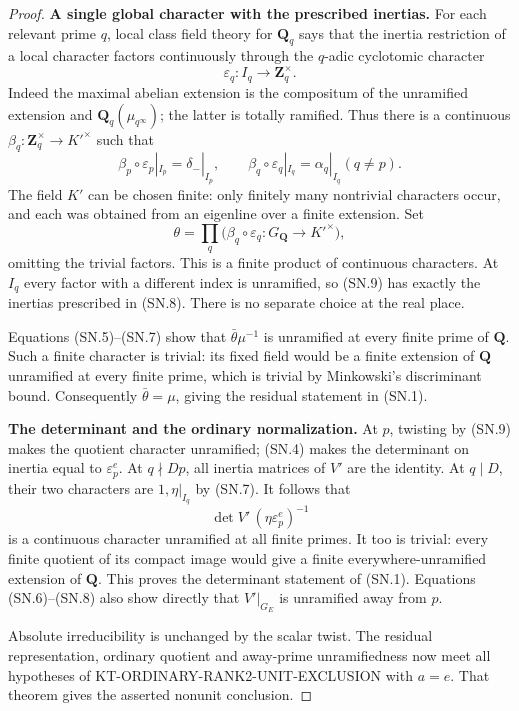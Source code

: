 \documentclass[11pt,a4paper]{article}
\theoremstyle{definition}
\renewcommand{\paragraph}[1]{\par\smallskip\noindent\textbf{#1}\quad\ignorespaces}
\begin{document}
\begin{proof}
\paragraph{A single global character with the prescribed inertias.}
For each relevant prime $q$, local class field theory for
$\mathbf Q_q$ says that the inertia restriction of a local
character factors continuously through the $q$-adic cyclotomic
character
\[
                 \varepsilon_q:I_q\longrightarrow
                                      \mathbf Z_q^{\times}.
\]
Indeed the maximal abelian extension is the compositum of the
unramified extension and $\mathbf Q_q(\mu_{q^{\infty}})$;
the latter is totally ramified.  Thus there is a continuous
$\beta_q:\mathbf Z_q^{\times}\to K'^{\times}$ such that
\[
 \beta_p\circ\varepsilon_p|_{I_p}=\delta_-|_{I_p},
 \qquad
 \beta_q\circ\varepsilon_q|_{I_q}=\alpha_q|_{I_q} (q\ne p).
                                                               \tag{SN.8}
\]
The field $K'$ can be chosen finite: only finitely many nontrivial
characters occur, and each was obtained from an eigenline over
a finite extension.  Set
\[
               \theta=\prod_q\bigl(\beta_q\circ
                         \varepsilon_q:G_{\mathbf Q}\to K'^{\times}\bigr),
                                                               \tag{SN.9}
\]
omitting the trivial factors.  This is a finite product of
continuous characters.  At $I_q$ every factor with a different
index is unramified, so (SN.9) has exactly the inertias prescribed
in (SN.8).  There is no separate choice at the real place.

Equations (SN.5)--(SN.7) show that $\bar\theta\mu^{-1}$ is
unramified at every finite prime of $\mathbf Q$.
Such a finite character is trivial: its fixed field would be
a finite extension of $\mathbf Q$ unramified at every finite
prime, which is trivial by Minkowski's discriminant bound.
Consequently $\bar\theta=\mu$, giving the residual statement
in (SN.1).

\paragraph{The determinant and the ordinary normalization.}
At $p$, twisting by (SN.9) makes the quotient character
unramified; (SN.4) makes the determinant on inertia equal to
$\varepsilon_p^e$.  At $q\nmid Dp$, all inertia matrices of
$V'$ are the identity.  At $q\mid D$, their two characters are
$1,\eta|_{I_q}$ by (SN.7).  It follows that
\[
                    \det V'\,(\eta\varepsilon_p^e)^{-1}
                                                               \tag{SN.10}
\]
is a continuous character unramified at all finite primes.
It too is trivial: every finite quotient of its compact image
would give a finite everywhere-unramified extension of
$\mathbf Q$.  This proves the determinant statement of (SN.1).
Equations (SN.6)--(SN.8) also show directly that
$V'|_{G_E}$ is unramified away from $p$.

Absolute irreducibility is unchanged by the scalar twist.
The residual representation, ordinary quotient and away-prime
unramifiedness now meet all hypotheses of
KT-ORDINARY-RANK2-UNIT-EXCLUSION with $a=e$.
That theorem gives the asserted nonunit conclusion.
\end{proof}
\end{document}
